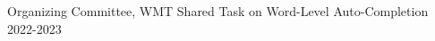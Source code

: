 















\thispagestyle{secondstyle}









Organizing Committee, WMT Shared Task on Word-Level Auto-Completion \hfill 2022-2023

